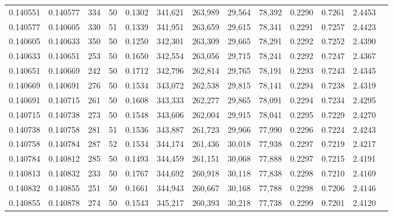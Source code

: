 \begin{tabular}{rrrrrrrrrrrrr}
0.140551 & 0.140577 &   334 &  50 &                                     0.1302 & 341,621 & 263,989 &  29,564 &  78,392 & 0.2290 & 0.7261 & 2.4453 \\
0.140577 & 0.140605 &   330 &  51 &                                     0.1339 & 341,951 & 263,659 &  29,615 &  78,341 & 0.2291 & 0.7257 & 2.4423 \\
0.140605 & 0.140633 &   350 &  50 &                                     0.1250 & 342,301 & 263,309 &  29,665 &  78,291 & 0.2292 & 0.7252 & 2.4390 \\
0.140633 & 0.140651 &   253 &  50 &                                     0.1650 & 342,554 & 263,056 &  29,715 &  78,241 & 0.2292 & 0.7247 & 2.4367 \\
0.140651 & 0.140669 &   242 &  50 &                                     0.1712 & 342,796 & 262,814 &  29,765 &  78,191 & 0.2293 & 0.7243 & 2.4345 \\
0.140669 & 0.140691 &   276 &  50 &                                     0.1534 & 343,072 & 262,538 &  29,815 &  78,141 & 0.2294 & 0.7238 & 2.4319 \\
0.140691 & 0.140715 &   261 &  50 &                                     0.1608 & 343,333 & 262,277 &  29,865 &  78,091 & 0.2294 & 0.7234 & 2.4295 \\
0.140715 & 0.140738 &   273 &  50 &                                     0.1548 & 343,606 & 262,004 &  29,915 &  78,041 & 0.2295 & 0.7229 & 2.4270 \\
0.140738 & 0.140758 &   281 &  51 &                                     0.1536 & 343,887 & 261,723 &  29,966 &  77,990 & 0.2296 & 0.7224 & 2.4243 \\
0.140758 & 0.140784 &   287 &  52 &                                     0.1534 & 344,174 & 261,436 &  30,018 &  77,938 & 0.2297 & 0.7219 & 2.4217 \\
0.140784 & 0.140812 &   285 &  50 &                                     0.1493 & 344,459 & 261,151 &  30,068 &  77,888 & 0.2297 & 0.7215 & 2.4191 \\
0.140813 & 0.140832 &   233 &  50 &                                     0.1767 & 344,692 & 260,918 &  30,118 &  77,838 & 0.2298 & 0.7210 & 2.4169 \\
0.140832 & 0.140855 &   251 &  50 &                                     0.1661 & 344,943 & 260,667 &  30,168 &  77,788 & 0.2298 & 0.7206 & 2.4146 \\
0.140855 & 0.140878 &   274 &  50 &                                     0.1543 & 345,217 & 260,393 &  30,218 &  77,738 & 0.2299 & 0.7201 & 2.4120 \\

\end{tabular}
